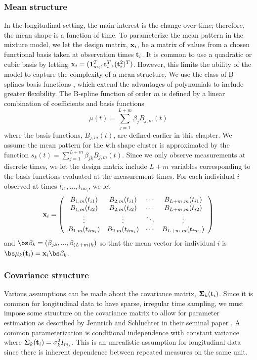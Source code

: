 \subsubsection{Mean structure}
In the longitudinal setting, the main interest is the change over time; therefore, the mean shape is a function of time. To parameterize the mean pattern in the mixture model, we let the design matrix, $\mathbf x_{i}$, be a matrix of values from a chosen functional basis taken at observation times $\mathbf t_{i}$. It is common to use a quadratic or cubic basis by letting $\mathbf x_{i} = (\mathbf 1_{m_{i}}^{T},\mathbf t_{i}^{T}, (\mathbf t^{2}_{i})^{T})$. However, this limits the ability of the model to capture the complexity of a mean structure. We use the class of B-splines basis functions \cite{deboor1978, schumaker1981,curry1966, de1976}, which extend the advantages of polynomials to include greater flexibility. The B-spline function of order $m$ is defined by a linear combination of coefficients and basis functions
$$\mu(t) = \sum^{L+m}_{j=1} \beta_j B_{j,m}(t)$$
where the basis functions, $B_{j,m}(t)$, are defined earlier in this chapter. We assume the mean pattern for the $k$th shape cluster is approximated by the function $s_{k}(t)=\sum^{L+m}_{j=1} \beta_{jk} B_{j,m}(t)$.  Since we only observe measurements at discrete times, we let the design matrix include $L+m$ variables corresponding to the basis functions evaluated at the measurement times.  For each individual $i$ observed at times $t_{i1},...,t_{im_{i}}$, we let $$\mathbf x_{i} = \left(\begin{array}{cccc} 
B_{1,m}(t_{i1})&B_{2,m}(t_{i1})&\cdots&B_{L+m,m}(t_{i1})\\
B_{1,m}(t_{i2})&B_{2,m}(t_{i2})&\cdots&B_{L+m,m}(t_{i2})\\
\vdots&\vdots&\ddots&\vdots\\
B_{1,m}(t_{im_{i}})&B_{2,m}(t_{im_{i}})&\cdots&B_{L+m,m}(t_{im_{i}})\end{array}\right)$$
and $\bs\beta_{k} = (\beta_{jk},...,\beta_{(L+m) k})$ so that the mean vector for individual $i$ is $\bs\mu_{k}(\B t_{i}) = \B x_{i}\bs\beta_{k}$.

\subsubsection{Covariance structure}
Various assumptions can be made about the covariance matrix, $\mathbf \Sigma_{k}(\mathbf t_{i})$. Since it is common for longitudinal data to have sparse, irregular time sampling, we must impose some structure on the covariance matrix to allow for parameter estimation as described by Jennrich and Schluchter in their seminal paper \cite{jennrich1986}. A common parameterization is conditional independence with constant variance where $\mathbf \Sigma_{k}(\mathbf t_{i}) = \sigma_{k}^{2}I_{m_{i}}$. This is an unrealistic assumption for longitudinal data since there is inherent dependence between repeated measures on the same unit. 

